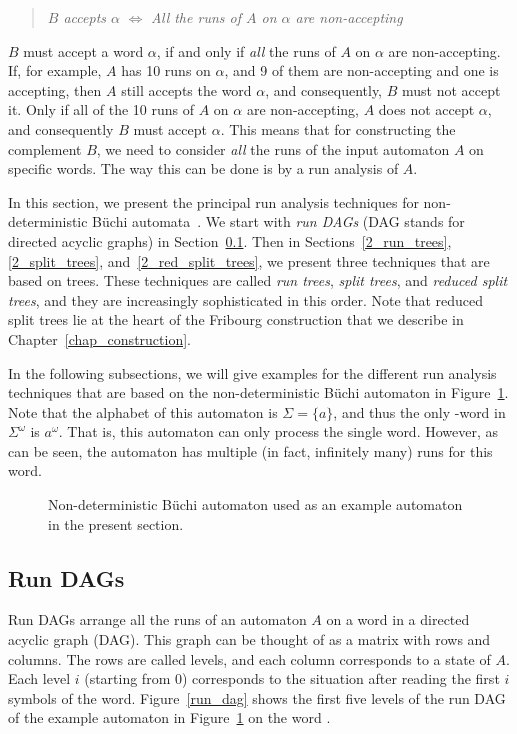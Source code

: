 \begin{quote}
\centering
\textit{$B$ accepts $\alpha$} $\Longleftrightarrow$ \textit{All the runs of $A$ on $\alpha$ are non-accepting}
\end{quote}

$B$ must accept a word $\alpha$, if and only if \textit{all} the runs of $A$ on $\alpha$ are non-accepting. If, for example, $A$ has 10 runs on $\alpha$, and 9 of them are non-accepting and one is accepting, then $A$ still accepts the word $\alpha$, and consequently, $B$ must not accept it. Only if all of the 10 runs of $A$ on $\alpha$ are non-accepting, $A$ does not accept $\alpha$, and consequently $B$ must accept $\alpha$. This means that for constructing the complement $B$, we need to consider \textit{all} the runs of the input automaton $A$ on specific words. The way this can be done is by a run analysis of $A$.

In this section, we present the principal run analysis techniques for non-deterministic Büchi automata~\cite{2014_wilke}. We start with \textit{run DAGs} (DAG stands for directed acyclic graphs) in Section~\ref{2_run_dags}. Then in Sections~\ref{2_run_trees}, \ref{2_split_trees}, and~\ref{2_red_split_trees}, we present three techniques that are based on trees. These techniques are called \textit{run trees}, \textit{split trees}, and \textit{reduced split trees}, and they are increasingly sophisticated in this order. Note that reduced split trees lie at the heart of the Fribourg construction that we describe in Chapter~\ref{chap_construction}.

In the following subsections, we will give examples for the different run analysis techniques that are based on the non-deterministic Büchi automaton in Figure~\ref{ex_aut_1}. Note that the alphabet of this automaton is $\Sigma=\{a\}$, and thus the only \om-word in $\Sigma^\omega$ is $a^\omega$. That is, this automaton can only process the single word. However, as can be seen, the automaton has multiple (in fact, infinitely many) runs for this word.

\begin{figure}[htb]
\centering
\Automaton
\caption{Non-deterministic Büchi automaton used as an example automaton in the present section.}
\label{ex_aut_1}
\end{figure}


\subsection{Run DAGs}
\label{2_run_dags}
Run DAGs arrange all the runs of an automaton $A$ on a word in a directed acyclic graph (DAG). This graph can be thought of as a matrix with rows and columns. The rows are called levels, and each column corresponds to a state of $A$. Each level $i$ (starting from 0) corresponds to the situation after reading the first $i$ symbols of the word. Figure~\ref{run_dag} shows the first five levels of the run DAG of the example automaton in Figure~\ref{ex_aut_1} on the word \aom.

